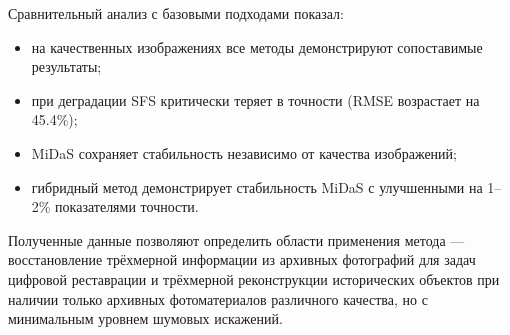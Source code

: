Сравнительный анализ с базовыми подходами показал:
\begin{itemize}
    \item на качественных изображениях все методы демонстрируют сопоставимые результаты;
    \item при деградации SFS критически теряет в точности (RMSE возрастает на 45.4\%);
    \item MiDaS сохраняет стабильность независимо от качества изображений;
    \item гибридный метод демонстрирует стабильность MiDaS с улучшенными на 1--2\% показателями точности.
\end{itemize}


Полученные данные позволяют определить области применения метода ---
восстановление трёхмерной информации из архивных фотографий для задач цифровой реставрации и трёхмерной реконструкции исторических объектов
при наличии только архивных фотоматериалов различного качества, но с минимальным уровнем шумовых искажений.


